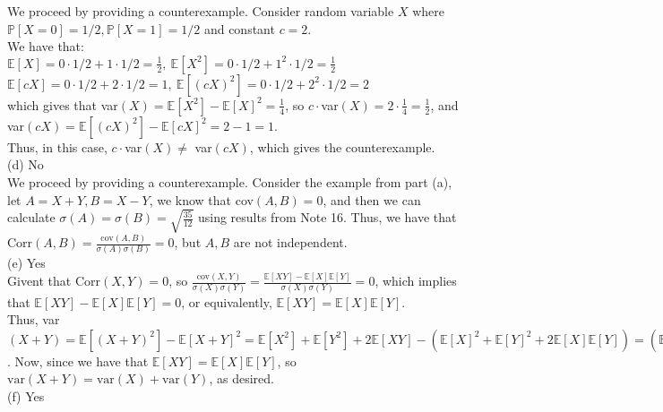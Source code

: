 \documentclass{article}
\begin{document}
We proceed by providing a counterexample. Consider random variable $X$ where $\mathbb{P}[X=0] = 1/2, \mathbb{P}[X=1] = 1/2$ and constant $c = 2$. \\

We have that: \\

$\mathbb{E}[X] = 0\cdot1/2+1\cdot1/2 = \frac{1}{2},\ \mathbb{E}[X^2] = 0\cdot1/2 + 1^2\cdot1/2 = \frac{1}{2}$ \\

$\mathbb{E}[cX] = 0\cdot1/2 + 2\cdot1/2 = 1,\ \mathbb{E}[(cX)^2] = 0\cdot1/2 + 2^2\cdot1/2 = 2$ \\

which gives that var$(X) = \mathbb{E}[X^2] - \mathbb{E}[X]^2 = \frac{1}{4}$, so $c\cdot$var$(X) = 2\cdot\frac{1}{4} = \frac{1}{2}$, and var$(cX) = \mathbb{E}[(cX)^2] - \mathbb{E}[cX]^2 = 2-1 = 1$. \\

Thus, in this case, $c\cdot$var$(X)\neq$ var$(cX)$, which gives the counterexample.\\[.5cm]
{\color{red} (d) No } \\

We proceed by providing a counterexample. Consider the example from part (a), let $A = X+Y, B = X-Y$, we know that cov$(A,B) = 0$, and then we can calculate $\sigma(A)=\sigma(B) = \sqrt{\frac{35}{12}}$ using results from Note 16. Thus, we have that Corr$(A,B) = \frac{\text{cov}(A,B)}{\sigma(A)\sigma(B)} = 0$, but $A,B$ are not independent. \\[.5cm]
{\color{red} (e) Yes } \\

Givent that Corr$(X,Y) = 0$, so
$\frac{\text{cov}(X,Y)}{\sigma(X)\sigma(Y)} =
\frac{\mathbb{E}[XY] - \mathbb{E}[X]\mathbb{E}[Y]}{\sigma(X)\sigma(Y)} = 0$, which implies that $\mathbb{E}[XY] - \mathbb{E}[X]\mathbb{E}[Y] = 0$, or equivalently, $\mathbb{E}[XY] = \mathbb{E}[X]\mathbb{E}[Y]$. \\

Thus, var$(X+Y) =
\mathbb{E}[(X+Y)^2] - \mathbb{E}[X+Y]^2 =
\mathbb{E}[X^2] + \mathbb{E}[Y^2] + 2\mathbb{E}[XY] - (\mathbb{E}[X]^2 + \mathbb{E}[Y]^2 + 2\mathbb{E}[X]\mathbb{E}[Y]) =
(\mathbb{E}[X^2]-\mathbb{E}[X]^2) + (\mathbb{E}[Y^2]-\mathbb{E}[Y]^2) + 2((\mathbb{E}[XY]-\mathbb{E}[X]\mathbb{E}[Y]) =
Var(X) + Var(Y) + 2((\mathbb{E}[XY]-\mathbb{E}[X]\mathbb{E}[Y])$. Now, since we have that $\mathbb{E}[XY] = \mathbb{E}[X]\mathbb{E}[Y]$, so $\text{var}(X+Y) = \text{var}(X) + \text{var}(Y)$, as desired. \\[.5cm]
{\color{red} (f) Yes } \\
\end{document}
